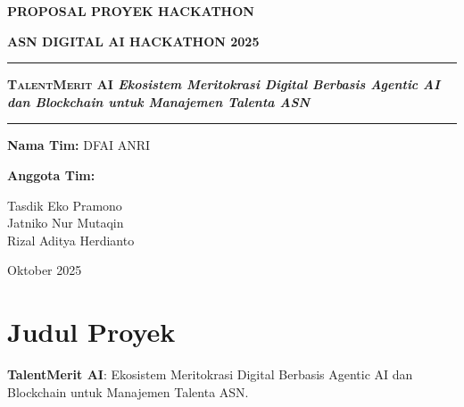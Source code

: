 \documentclass[11pt, a4paper]{article}
\begin{document}
\begin{titlepage}
    \centering
    \vspace*{1cm}
    
    \Huge\bfseries
    PROPOSAL PROYEK HACKATHON
    
    \vspace{0.5cm}
    
    \huge\bfseries
    ASN DIGITAL AI HACKATHON 2025
    
    \vspace{2cm}
    
    \rule{\linewidth}{1.5pt}
    \vspace{0.4cm}
    \Huge\bfseries\textsc{TalentMerit AI}
    \newline
    \vspace{0.4cm}
    \large\textit{Ekosistem Meritokrasi Digital Berbasis Agentic AI dan Blockchain untuk Manajemen Talenta ASN}
    \vspace{0.4cm}
    \rule{\linewidth}{1.5pt}
    


    \vspace{3cm}
    
    \large
    \textbf{Nama Tim:} DFAI ANRI
    
    \vspace{0.5cm}
    
    \textbf{Anggota Tim:}
    
    \vspace{0.3cm}
    
    \begin{center}
        Tasdik Eko Pramono\\
        Jatniko Nur Mutaqin\\
        Rizal Aditya Herdianto
    \end{center}
    
    \vfill
    
    \large
    Oktober 2025
    
\end{titlepage}

\tableofcontents
\newpage

\section{Judul Proyek}
\textbf{TalentMerit AI}: Ekosistem Meritokrasi Digital Berbasis Agentic AI dan Blockchain untuk Manajemen Talenta ASN.
\end{document}
